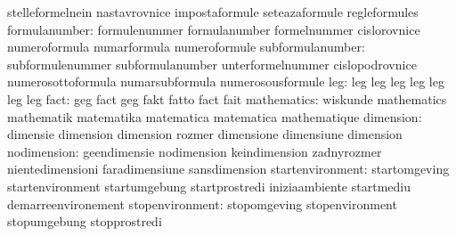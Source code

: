                                  stelleformelnein                 nastavrovnice
                                  impostaformule                   seteazaformule
                                  regleformules
                   formulanumber: formulenummer                    formulanumber
                                  formelnummer                     cislorovnice
                                  numeroformula                    numarformula
                                  numeroformule
                subformulanumber: subformulenummer                 subformulanumber
                                  unterformelnummer                cislopodrovnice
                                  numerosottoformula               numarsubformula
                                  numerosousformule
                             leg: leg                              leg
                                  leg                              leg
                                  leg                              leg
                                  leg
                            fact: geg                              fact
                                  geg                              fakt
                                  fatto                            fact
                                  fait
                     mathematics: wiskunde                         mathematics
                                  mathematik                       matematika
                                  matematica                       matematica
                                  mathematique
                       dimension: dimensie                         dimension
                                  dimension                        rozmer
                                  dimensione                       dimensiune
                                  dimension
                     nodimension: geendimensie                     nodimension
                                  keindimension                    zadnyrozmer
                                  nientedimensioni                 faradimensiune
                                  sansdimension
                startenvironment: startomgeving                    startenvironment
                                  startumgebung                    startprostredi
                                  iniziaambiente                   startmediu
                                  demarreenvironement
                 stopenvironment: stopomgeving                     stopenvironment
                                  stopumgebung                     stopprostredi
